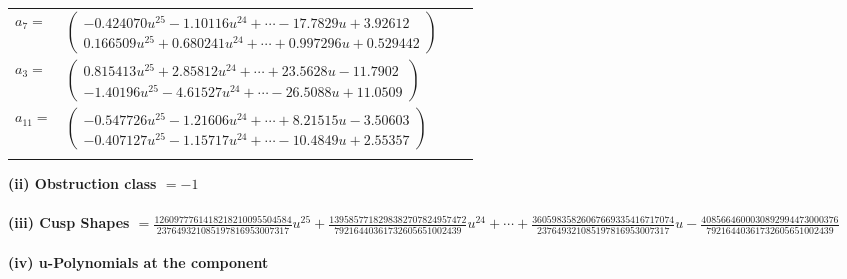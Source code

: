 \documentclass[1p]{elsarticle_modified}
\theoremstyle{definition}
\begin{document}
\begin{tabular}{m{7pt} m{180pt} m{7pt} m{180pt} }
\flushright $a_{7}=$&$\begin{pmatrix}-0.424070 u^{25}-1.10116 u^{24}+\cdots-17.7829 u+3.92612\\0.166509 u^{25}+0.680241 u^{24}+\cdots+0.997296 u+0.529442\end{pmatrix}$ \\
\flushright $a_{3}=$&$\begin{pmatrix}0.815413 u^{25}+2.85812 u^{24}+\cdots+23.5628 u-11.7902\\-1.40196 u^{25}-4.61527 u^{24}+\cdots-26.5088 u+11.0509\end{pmatrix}$ \\
\flushright $a_{11}=$&$\begin{pmatrix}-0.547726 u^{25}-1.21606 u^{24}+\cdots+8.21515 u-3.50603\\-0.407127 u^{25}-1.15717 u^{24}+\cdots-10.4849 u+2.55357\end{pmatrix}$\\&\end{tabular}
\flushleft \textbf{(ii) Obstruction class $= -1$}\\~\\
\flushleft \textbf{(iii) Cusp Shapes $= \frac{1260977761418218210095504584}{237649321085197816953007317} u^{25}+\frac{1395857718298382707824957472}{79216440361732605651002439} u^{24}+\cdots+\frac{36059835826067669335416717074}{237649321085197816953007317} u-\frac{4085664600030892994473000376}{79216440361732605651002439}$}\\~\\
\newpage\renewcommand{\arraystretch}{1}
\flushleft \textbf{(iv) u-Polynomials at the component}\newline \\
\end{document}
